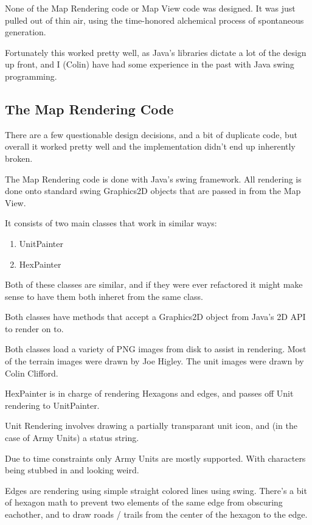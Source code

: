 \documentclass[12pt,a4paper]{article}
\begin{document}
None of the Map Rendering code or Map View code was designed.
It was just pulled out of thin air, using the time-honored alchemical process
of spontaneous generation.

Fortunately this worked pretty well, as Java's libraries dictate a lot
of the design up front, and I (Colin) have had some experience in the past
with Java swing programming.

\subsection{The Map Rendering Code}
There are a few questionable design decisions, and a bit of duplicate code,
but overall it worked pretty well and the implementation didn't end up
inherently broken.

The Map Rendering code is done with Java's swing framework. All rendering
is done onto standard swing Graphics2D objects that are passed in from the
Map View.

It consists of two main classes that work in similar ways:
\begin{enumerate}
\item{UnitPainter}
\item{HexPainter}
\end{enumerate}

Both of these classes are similar, and if they were ever refactored it might
make sense to have them both inheret from the same class.

Both classes have methods that accept a Graphics2D object from Java's 2D API
to render on to.

Both classes load a variety of PNG images from disk to assist in rendering.
Most of the terrain images were drawn by Joe Higley.
The unit images were drawn by Colin Clifford.

HexPainter is in charge of rendering Hexagons and edges,
and passes off Unit rendering to UnitPainter.

Unit Rendering involves drawing a partially transparant unit icon,
and (in the case of Army Units) a status string.

Due to time constraints only Army Units are mostly supported. With characters
being stubbed in and looking weird.

Edges are rendering using simple straight colored lines using swing.
There's a bit of hexagon math to prevent two elements of the same edge
from obscuring eachother, and to draw roads / trails from the center of the
hexagon to the edge.
\end{document}
